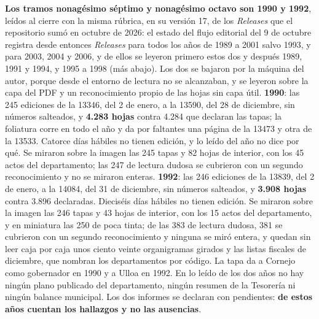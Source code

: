 \textbf{Los tramos nonagésimo séptimo y nonagésimo octavo son 1990 y 1992}, leídos al cierre con la misma rúbrica, en su versión 17, de los \textit{Releases} que el repositorio sumó en octubre de 2026: el estado del flujo editorial del 9 de octubre registra desde entonces \textit{Releases} para todos los años de 1989 a 2001 salvo 1993, y para 2003, 2004 y 2006, y de ellos se leyeron primero estos dos y después 1989, 1991 y 1994, y 1995 a 1998 (más abajo). Los dos se bajaron por la máquina del autor, porque desde el entorno de lectura no se alcanzaban, y se leyeron sobre la capa del PDF y un reconocimiento propio de las hojas sin capa útil. \textbf{1990}: las 245 ediciones de la 13346, del 2 de enero, a la 13590, del 28 de diciembre, sin números salteados, y \textbf{4.283 hojas} contra 4.284 que declaran las tapas; la foliatura corre en todo el año y da por faltantes una página de la 13473 y otra de la 13533. Catorce días hábiles no tienen edición, y lo leído del año no dice por qué. Se miraron sobre la imagen las 245 tapas y 82 hojas de interior, con los 45 actos del departamento; las 247 de lectura dudosa se cubrieron con un segundo reconocimiento y no se miraron enteras. \textbf{1992}: las 246 ediciones de la 13839, del 2 de enero, a la 14084, del 31 de diciembre, sin números salteados, y \textbf{3.908 hojas} contra 3.896 declaradas. Dieciséis días hábiles no tienen edición. Se miraron sobre la imagen las 246 tapas y 43 hojas de interior, con los 15 actos del departamento, y en miniatura las 250 de poca tinta; de las 383 de lectura dudosa, 381 se cubrieron con un segundo reconocimiento y ninguna se miró entera, y quedan sin leer caja por caja unos ciento veinte organigramas girados y las listas fiscales de diciembre, que nombran los departamentos por código. La tapa da a Cornejo como gobernador en 1990 y a Ulloa en 1992. En lo leído de los dos años no hay ningún plano publicado del departamento, ningún resumen de la Tesorería ni ningún balance municipal. Los dos informes se declaran con pendientes: \textbf{de estos años cuentan los hallazgos y no las ausencias}.

